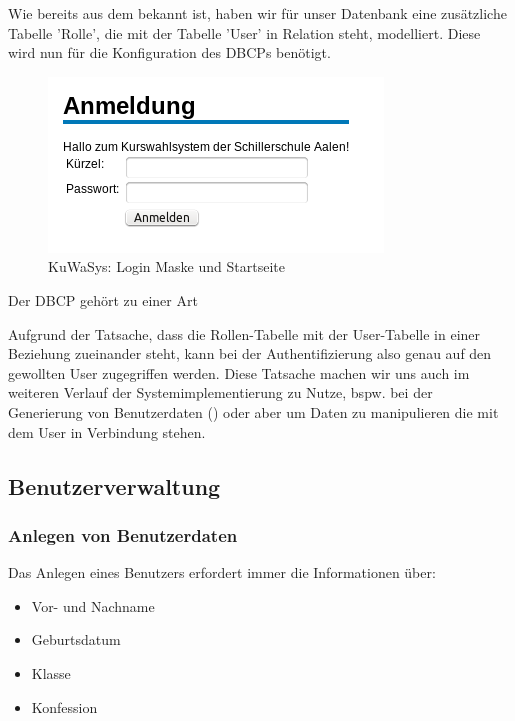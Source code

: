 Wie bereits aus dem  bekannt ist, haben wir für unser Datenbank eine zusätzliche Tabelle 'Rolle', die mit der Tabelle 'User' in Relation steht, modelliert. Diese wird nun für die Konfiguration des \ac{DBCP}s benötigt.

\begin{figure}
 \begin{center}
   \includegraphics[scale=0.7]{img/login_KuWaSys.png}
 \end{center}
 \caption[\textbf{KuWaSys: Login Maske und Startseite}]{KuWaSys: Login Maske und Startseite}
 \label{fig:login_KuWaSys}
\end{figure}

Der \ac{DBCP} gehört zu einer Art

Aufgrund der Tatsache, dass die Rollen-Tabelle mit der User-Tabelle in einer Beziehung zueinander steht, kann bei der Authentifizierung also genau auf den gewollten User zugegriffen werden. Diese Tatsache machen wir uns auch im weiteren Verlauf der Systemimplementierung zu Nutze, bspw. bei der Generierung von Benutzerdaten () oder aber um Daten zu manipulieren die mit dem User in Verbindung stehen.

\subsection{Benutzerverwaltung}\label{subsec:Daten eines Benutzers}

\subsubsection{Anlegen von Benutzerdaten}

Das Anlegen eines Benutzers erfordert immer die Informationen über:
\begin{itemize}
  \item Vor- und Nachname
  \item Geburtsdatum
  \item Klasse
  \item Konfession
\end{itemize}

